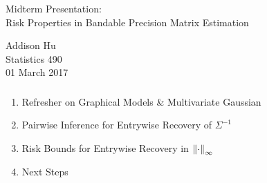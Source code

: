 
\usepackage{sty/personalmacros}
\usepackage{sty/personalslides}


\begin{frame}[fragile] \frametitle{}
\vfill
\vspace{0.2cm}
{
    \color{yaleblue}
    \fontsize{0.5cm}{0cm}\selectfont
    Midterm Presentation: \\
}
\vspace{1.0cm}
{
    \fontsize{0.7cm}{0cm}\selectfont
    Risk Properties in Bandable Precision Matrix Estimation\\
}

\hfill

\vspace{1.8cm}
\begin{minipage}{1.0\textwidth}\raggedleft
    \color{yaleblue}
    Addison Hu   \\
    Statistics 490 \\
    01 March 2017
\end{minipage}
\end{frame}
\begin{frame}[fragile] \frametitle{}
    \begin{enumerate}
        \item Refresher on Graphical Models \& Multivariate Gaussian
        \item Pairwise Inference for Entrywise Recovery of $\Sigma^{-1}$
        \item Risk Bounds for Entrywise Recovery in $\left\lVert\cdot\right\rVert_\infty$
        \item Next Steps
    \end{enumerate}
\end{frame}

